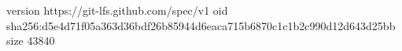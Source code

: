 version https://git-lfs.github.com/spec/v1
oid sha256:d5e4d71f05a363d36bdf26b85944d6eaca715b6870c1c1b2c990d12d643d25bb
size 43840
